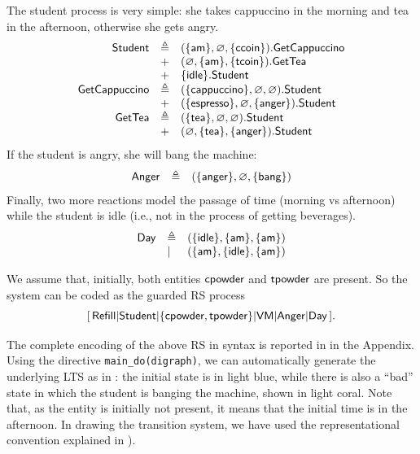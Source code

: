 The student process is very simple: she takes cappuccino in the morning and tea in the afternoon, otherwise she gets angry.
\[
\begin{array}{rll}
\mathsf{Student} & \triangleq & (\{{\text{\sffamily am}}\},\varnothing,\{{\text{\sffamily ccoin}}\}).\mathsf{GetCappuccino}\\
& + & (\varnothing,\{{\text{\sffamily am}}\},\{{\text{\sffamily tcoin}}\}).\mathsf{GetTea}\\
& + & \{{\text{\sffamily idle}}\}.\mathsf{Student}\\
\mathsf{GetCappuccino} & \triangleq & (\{{\text{\sffamily cappuccino}}\},\varnothing,\varnothing).\mathsf{Student}\\
& + & (\{{\text{\sffamily espresso}}\},\varnothing,\{{\text{\sffamily anger}}\}).\mathsf{Student}\\
\mathsf{GetTea} & \triangleq & (\{{\text{\sffamily tea}}\},\varnothing,\varnothing).\mathsf{Student}\\
& + & (\varnothing,\{{\text{\sffamily tea}}\},\{{\text{\sffamily anger}}\}).\mathsf{Student}\\
\end{array}
\]
If the student is angry, she will bang the machine:
\[
\begin{array}{lll}
\mathsf{Anger} & \triangleq & (\{{\text{\sffamily anger}}\},\varnothing,\{{\text{\sffamily bang}}\})
\end{array}
\]
Finally, two more reactions model the passage of time (morning vs afternoon) while the student is idle (i.e., not in the process of getting beverages).
\[
\begin{array}{lll}
\mathsf{Day} & \triangleq & (\{{\text{\sffamily idle}}\},\{{\text{\sffamily am}}\},\{{\text{\sffamily am}}\})\\
& | & (\{{\text{\sffamily am}}\},\{{\text{\sffamily idle}}\},\{{\text{\sffamily am}}\})
\end{array}
\]

We assume that, initially, both entities ${\text{\sffamily cpowder}}$ and ${\text{\sffamily tpowder}}$ are present.
So the system can be coded as the guarded RS process
\[
[\,\mathsf{Refill}
| \mathsf{Student}
| \{{\text{\sffamily cpowder}},{\text{\sffamily tpowder}}\} 
| \mathsf{VM}
| \mathsf{Anger}
| \mathsf{Day}\,] .
\]

The complete encoding of the above RS in \BioResolve syntax is reported in  in the Appendix.
Using the \BioResolve directive \verb=main_do(digraph)=, we can automatically generate the underlying LTS as in : the initial state is in light blue, while there is also a ``bad'' state in which the student is banging the machine, shown in light coral.
Note that, as the entity \am is initially not present, it means that the initial time is in the afternoon. In drawing the transition system, we have used the representational convention explained in ).

